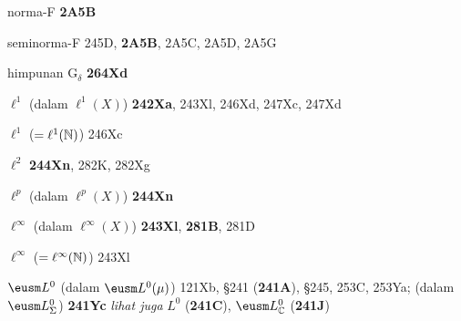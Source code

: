 norma-F {\bf 2A5B}


seminorma-F 245D, {\bf 2A5B}, 2A5C, 2A5D, 2A5G 


\indexmedskip
{}

himpunan G$_{\delta}$ {\bf 264Xd}































































\indexmedskip
{}



$\ell^1$ (dalam $\ell^1(X)$) {\bf 242Xa}, 243Xl, 246Xd, 247Xc,
247Xd


$\ell^1$ ($=\ell^1(\Bbb N)$) 246Xc


$\ell^2$ {\bf 244Xn}, 282K, 282Xg


$\ell^p$ (dalam $\ell^p(X)$) {\bf 244Xn}


$\ell^{\infty}$ (dalam $\ell^{\infty}(X)$) {\bf 243Xl}, {\bf 281B}, 281D


$\ell^{\infty}$ ($=\ell^{\infty}(\Bbb N)$) 243Xl












$\eusm L^0$ (dalam $\eusm L^0(\mu)$) 121Xb,
  \S241 ({\bf 241A}), \S245, 253C, 253Ya;
  (dalam $\eusm L^0_{\Sigma}$) {\bf 241Yc}
  {\it lihat juga} $L^0$ ({\bf 241C}),
$\eusm L^0_{\Bbb C}$ ({\bf 241J})




